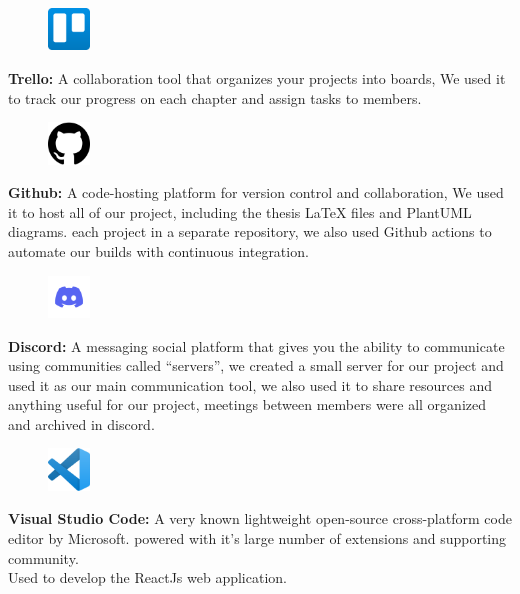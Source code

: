 \documentclass[]{uc2pfecaneva}
\begin{document}
    \noindent
    \begin{figure}
        \includegraphics[width=0.10\textwidth]{images/trello}
    \end{figure}
    \textbf{Trello: } A collaboration tool that organizes your projects into boards, We used it to track our progress on each chapter and assign tasks to members. 
    \clearpage
    \begin{figure}
        \includegraphics[width=0.10\textwidth]{images/github}
        \vspace{-30pt}
    \end{figure} \noindent
    \textbf{Github: } A code-hosting platform for version control and collaboration, We used it to host all of our project, including the thesis LaTeX files and PlantUML diagrams.
    each project in a separate repository, we also used Github actions to automate our builds with continuous integration.

    \begin{figure}
        \includegraphics[width=0.10\textwidth]{images/discord}
        \vspace{-30pt}
    \end{figure} \noindent
    \textbf{Discord: } A messaging social platform that gives you the ability to communicate using communities called “servers”, we created a small server for our project and used it as our main communication tool, we also used it to share resources and anything useful for our project, meetings between members were all organized and archived in discord.

    \begin{figure}
        \includegraphics[width=0.10\textwidth]{images/vscode}
        \vspace{-40pt}
    \end{figure} \noindent
    \textbf{Visual Studio Code: } A very known lightweight open-source cross-platform code editor by Microsoft.
    powered with it's large number of extensions and supporting community. \\
    Used to develop the ReactJs web application.
\end{document}
